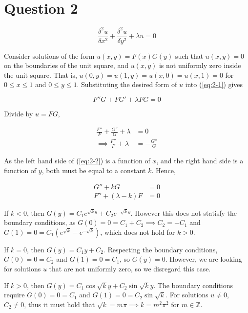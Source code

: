 \documentclass{article}
\newcommand\pdsq[2]{\frac{\delta^2{#1}}{\delta{#2}^2}}
\begin{document}
\section*{Question 2}

\begin{equation} \label{eq:2-1}
    \pdsq{u}{x} + \pdsq{u}{y} + \lambda u = 0
\end{equation}

Consider solutions of the form $u(x, y) = F(x)G(y)$ such that $u(x, y) = 0$ on the boundaries of
the unit square, and $u(x, y)$ is not uniformly zero inside the unit square. That is,
$u(0, y) = u(1, y) = u(x, 0) = u(x, 1) = 0$ for $0 \leq x \leq 1$ and $0 \leq y \leq 1$.
Substituting the desired form of $u$ into (\ref{eq:2-1}) gives

\begin{equation*}
    F''G + FG' + \lambda FG = 0
\end{equation*}

Divide by $u = FG$,

\begin{align}
    \frac{F''}{F} + \frac{G''}{G} + \lambda &= 0\nonumber\\
    \implies \frac{F''}{F} + \lambda &= -\frac{G''}{G} \label{eq:2-2}
\end{align}

As the left hand side of (\ref{eq:2-2}) is a function of $x$, and the right hand side is a function
of $y$, both must be equal to a constant $k$. Hence,

\begin{align}
    G'' + kG &= 0 \label{eq:2-3}\\
    F'' + (\lambda - k)F &= 0 \label{eq:2-4}
\end{align}

If $k < 0$, then $G(y) = C_1 e^{\sqrt{k} y} + C_2 e^{-\sqrt{k}y}$. However this does not statisfy
the boundary conditions, as $G(0) = 0 = C_1 + C_2 \implies C_2 = -C_1$ and 
$G(1) = 0 = C_1(e^{\sqrt{k}} - e^{-\sqrt{k}})$, which does not hold for $k > 0$.

\hfill \break
If $k = 0$, then $G(y) = C_1y + C_2$. Respecting the boundary conditions,
$G(0) = 0 = C_2$ and $G(1) = 0 = C_1$, so $G(y) = 0$. However, we are looking for solutions $u$ that
are not uniformly zero, so we disregard this case.

\hfill \break
If $k > 0$, then $G(y) = C_1\cos\sqrt{k}y + C_2\sin\sqrt{k}y$. The boundary conditions require
$G(0) = 0 = C_1$ and $G(1) = 0 = C_2\sin\sqrt{k}$. For solutions $u \neq 0$, $C_2 \neq 0$, thus it
must hold that $\sqrt{k} = m\pi \implies k = m^2\pi^2$ for $m \in \mathbb{Z}$.
\end{document}
